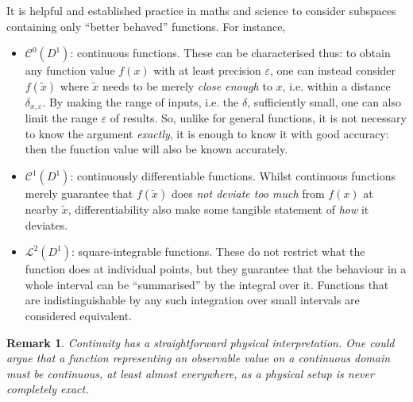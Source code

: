 \documentclass[final,sigplan]{acmart}\settopmatter{printfolios=true,printccs=false,printacmref=false}
\theoremstyle{acmplain}
\theoremstyle{acmdefinition}
\newtheorem{remark}[theorem]{Remark}
\begin{document}
It is helpful and established practice in maths and science to consider subspaces containing only “better behaved” functions.
For instance,
\begin{itemize}
\item $\mathcal{C}^0(D^1)$: continuous functions.
  These can be characterised thus: to obtain any function value $f(x)$ with at least precision $\varepsilon$, one can instead consider $f(\tilde{x})$ where $\tilde{x}$ needs to be merely \emph{close enough} to $x$, i.e. within a distance $\delta_{x,\varepsilon}$. By making the range of inputs, i.e. the $\delta$, sufficiently small, one can also limit the range $\varepsilon$ of results. So, unlike for general functions, it is not necessary to know the argument \emph{exactly}, it is enough to know it with good accuracy: then the function value will also be known accurately.
 \item $\mathcal{C}^1(D^1)$: continuously differentiable functions. Whilst continuous functions merely guarantee that $f(\tilde{x})$ does \emph{not deviate too much} from $f(x)$ at nearby $\tilde{x}$, differentiability also make some tangible statement of \emph{how} it deviates.
 \item $\mathcal{L}^2(D^1)$: square-integrable functions. These do not restrict what the function does at individual points, but they guarantee that the behaviour in a whole interval can be “summarised” by the integral over it. Functions that are indistinguishable by any such integration over small intervals are considered equivalent.
\end{itemize}
\begin{remark}
  Continuity has a straightforward physical interpretation.
  One could argue that a function representing an observable value on a continuous domain \emph{must} be continuous, at least almost everywhere,
  as a physical setup is never completely exact.
\end{remark}
\end{document}
